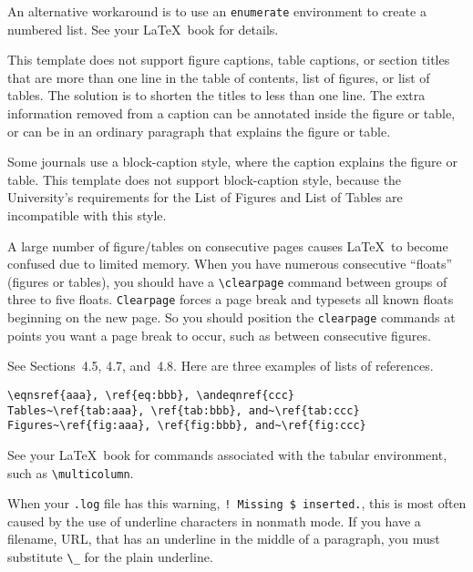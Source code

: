 An alternative workaround is to use an {\tt enumerate} environment
to create a numbered list.  See your \LaTeX\ book for details.


%
%
This template does not support figure captions, table captions, 
or section titles that are more than one line
in the table of contents, 
list of figures, 
or list of tables.  
The solution is to shorten the titles to less than one line.  
The extra information removed from a caption can be
annotated inside the figure or table, 
or can be in an ordinary paragraph that explains the figure or table.

Some journals use a block-caption style, where the caption explains the figure or table.  This template does not support block-caption style, because the University's requirements for the List of Figures and List of Tables are incompatible with this style.

%
%
A large number of figure/tables
on consecutive pages causes \LaTeX\ to become confused due 
to limited memory.  When you have numerous consecutive ``floats'' 
(\ie figures or tables), you should have a \verb+\clearpage+ command
between groups of three to five floats.   
{\tt Clearpage} forces a page break and typesets all known floats
beginning on the new page.  So you should position the {\tt clearpage}
commands at points you want a page break to occur, 
such as between consecutive figures.

%
See Sections~4.5, 4.7, and~4.8.
Here are three examples of lists of references.

\newspacing{\singlespacing}\begin{verbatim}
\eqnsref{aaa}, \ref{eq:bbb}, \andeqnref{ccc}
Tables~\ref{tab:aaa}, \ref{tab:bbb}, and~\ref{tab:ccc}
Figures~\ref{fig:aaa}, \ref{fig:bbb}, and~\ref{fig:ccc}
\end{verbatim}

%
See your \LaTeX\ book for commands associated 
with the tabular environment, 
such as \verb+\multicolumn+.

%
%
When your {\tt *.log} file has this warning,
{\tt ! Missing \$ inserted.},
this is most often caused by the use of underline characters in 
nonmath mode.  
If you have a filename, URL, \etc that has an underline in the
middle of a paragraph, you must substitute \verb+\_+ 
for the plain underline.  

